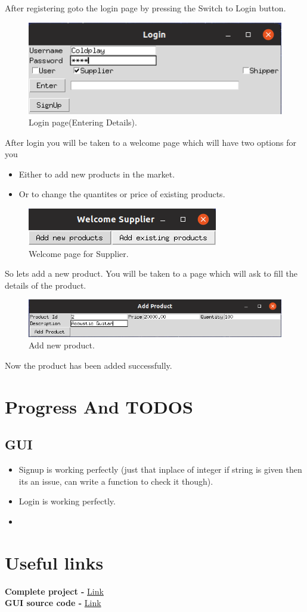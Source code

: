 \documentclass[a4paper,12pt]{article}
\begin{document}
After registering goto the login page by pressing the Switch to Login button.
\begin{figure}[H]
    \centering
    \includegraphics[scale=0.5]{login2.png} 
    \caption{Login page(Entering Details).}
\end{figure}
After login you will be taken to a welcome page which will have two options for you 
\begin{itemize}
    \item Either to add new products in the market.
    \item Or to change the quantites or price of existing products. 
\end{itemize}
\begin{figure}[H]
    \centering
    \includegraphics[scale=0.5]{supp1.png} 
    \caption{Welcome page for Supplier.}
\end{figure}
So lets add a new product. You will be taken to a page which will ask to fill the details of the product.
\begin{figure}[H]
    \centering
    \includegraphics[scale=0.5]{supp2.png} 
    \caption{Add new product.}
\end{figure}
Now the product has been added successfully.

\newpage
\section{Progress And TODOS}
\subsection{GUI}
\begin{itemize}
  \item Signup is working perfectly (just that inplace of integer if string is given then its an issue, can write a function to check it though).
  \item Login is working perfectly.
  \item 
\end{itemize}
\section{Useful links}
\begin{center}
\textbf{Complete project - } \href{https://github.com/nikhilyadv/DBMS-Lab-Project}{Link}\\
\textbf{GUI source code - } \href{https://github.com/nikhilyadv/DBMS-Lab-Project/tree/master/GUI}{Link}
\end{center}
\end{document}
